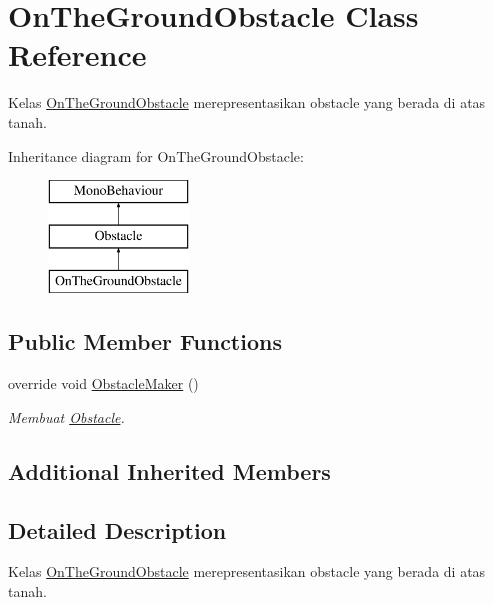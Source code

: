 \hypertarget{class_on_the_ground_obstacle}{}\section{On\+The\+Ground\+Obstacle Class Reference}
\label{class_on_the_ground_obstacle}


Kelas \hyperlink{class_on_the_ground_obstacle}{On\+The\+Ground\+Obstacle} merepresentasikan obstacle yang berada di atas tanah.  


Inheritance diagram for On\+The\+Ground\+Obstacle\+:\begin{figure}[H]
\begin{center}
\leavevmode
\includegraphics[height=3.000000cm]{class_on_the_ground_obstacle}
\end{center}
\end{figure}
\subsection*{Public Member Functions}
\begin{DoxyCompactItemize}
\item 
override void \hyperlink{class_on_the_ground_obstacle_a6c6123b29a6d6c2b78fa12ff72bf0834}{Obstacle\+Maker} ()
\begin{DoxyCompactList}\small\item\em Membuat \hyperlink{class_obstacle}{Obstacle}. \end{DoxyCompactList}\end{DoxyCompactItemize}
\subsection*{Additional Inherited Members}


\subsection{Detailed Description}
Kelas \hyperlink{class_on_the_ground_obstacle}{On\+The\+Ground\+Obstacle} merepresentasikan obstacle yang berada di atas tanah. 



